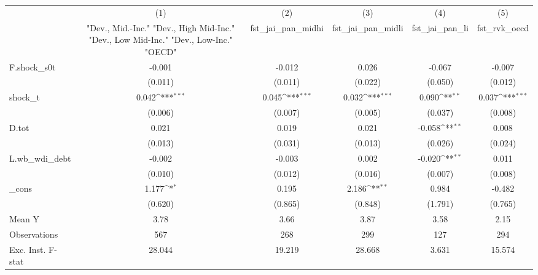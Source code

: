 {
\def\sym#1{\ifmmode^{#1}\else\(^{#1}\)\fi}
\begin{tabular}{l*{5}{c}}
\toprule
            &\multicolumn{1}{c}{(1)}&\multicolumn{1}{c}{(2)}&\multicolumn{1}{c}{(3)}&\multicolumn{1}{c}{(4)}&\multicolumn{1}{c}{(5)}\\
            &\multicolumn{1}{c}{ "Dev., Mid.-Inc." "Dev., High Mid-Inc." "Dev., Low Mid-Inc." "Dev., Low-Inc." "OECD" }&\multicolumn{1}{c}{fst\_jai\_pan\_midhi}&\multicolumn{1}{c}{fst\_jai\_pan\_midli}&\multicolumn{1}{c}{fst\_jai\_pan\_li}&\multicolumn{1}{c}{fst\_rvk\_oecd}\\
\midrule
F.shock\_s0t &      -0.001         &      -0.012         &       0.026         &      -0.067         &      -0.007         \\
            &     (0.011)         &     (0.011)         &     (0.022)         &     (0.050)         &     (0.012)         \\
\addlinespace
shock\_t     &       0.042\sym{***}&       0.045\sym{***}&       0.032\sym{***}&       0.090\sym{**} &       0.037\sym{***}\\
            &     (0.006)         &     (0.007)         &     (0.005)         &     (0.037)         &     (0.008)         \\
\addlinespace
D.tot       &       0.021         &       0.019         &       0.021         &      -0.058\sym{**} &       0.008         \\
            &     (0.013)         &     (0.031)         &     (0.013)         &     (0.026)         &     (0.024)         \\
\addlinespace
L.wb\_wdi\_debt&      -0.002         &      -0.003         &       0.002         &      -0.020\sym{**} &       0.011         \\
            &     (0.010)         &     (0.012)         &     (0.016)         &     (0.007)         &     (0.008)         \\
\addlinespace
\_cons      &       1.177\sym{*}  &       0.195         &       2.186\sym{**} &       0.984         &      -0.482         \\
            &     (0.620)         &     (0.865)         &     (0.848)         &     (1.791)         &     (0.765)         \\
\midrule
Mean Y      &        3.78         &        3.66         &        3.87         &        3.58         &        2.15         \\
Observations&         567         &         268         &         299         &         127         &         294         \\
Exc. Inst. F-stat&      28.044         &      19.219         &      28.668         &       3.631         &      15.574         \\
\bottomrule
\end{tabular}
}
